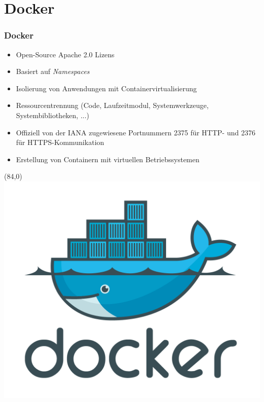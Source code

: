 \documentclass{beamer}
\begin{document}
\section{Docker}
\begin{frame}
\frametitle{Docker}

\begin{itemize}
\setlength{\itemsep}{12pt}
\item Open-Source Apache 2.0 Lizens
\item Basiert auf \textit{Namespaces}
\item Isolierung von Anwendungen mit Containervirtualisierung
\item Ressourcentrennung (Code, Laufzeitmodul, Systemwerkzeuge, Systembibliotheken, ...)
\item Offiziell von der IANA zugewiesene Portnummern 2375 für HTTP- und 2376 für HTTPS-Kommunikation
\item Erstellung von Containern mit virtuellen Betriebssystemen
\end{itemize}

\begin{textblock}{20}(84,0)
\includegraphics[scale=0.22]{docker.png}
\end{textblock}

\end{frame}
\end{document}
